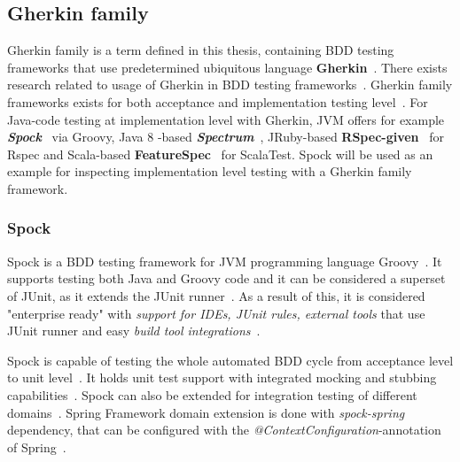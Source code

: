     \subsection{Gherkin family}
    Gherkin family is a term defined in this thesis, containing BDD testing frameworks that use predetermined ubiquitous
    language \textbf{Gherkin}~\cite{gherkin}. There exists research related to usage of Gherkin in BDD testing frameworks~\cite{okolnychyi2016study}.
    Gherkin family frameworks exists for both acceptance and implementation testing level~\cite{okolnychyi2016study}. For Java-code testing at
    implementation level with Gherkin, JVM offers for example \textbf{\textit{Spock}}~\cite{spock} via Groovy, Java 8 -based \textbf{\textit{Spectrum}}~\cite{spectrum},
    JRuby-based \textbf{RSpec-given}~\cite{rspec-given} for Rspec and Scala-based \textbf{FeatureSpec}~\cite{featurespec} for ScalaTest.
    Spock will be used as an example for inspecting implementation level testing with a Gherkin family framework.

    \subsubsection{Spock}
    Spock is a BDD testing framework for JVM programming language Groovy~\cite{kapelonis2016java}. It supports
    testing both Java and Groovy code and it can be considered a superset of JUnit, as it extends the JUnit runner~\cite{spock}.
    As a result of this, it is considered "enterprise ready" with \textit{support for IDEs, JUnit rules, external tools} that use
    JUnit runner and easy \textit{build tool integrations}~\cite{kapelonis2016java}.

    Spock is capable of testing the whole automated BDD cycle from acceptance level to unit level~\cite{kapelonis2016java}.
    It holds unit test support with integrated mocking and stubbing capabilities~\cite{spock}.
    Spock can also be extended for integration testing of different domains~\cite{kapelonis2016java}.
    Spring Framework domain extension is done with \textit{spock-spring} dependency, that can be configured with
    the \textit{@ContextConfiguration}-annotation of Spring~\cite{springintegration}.


